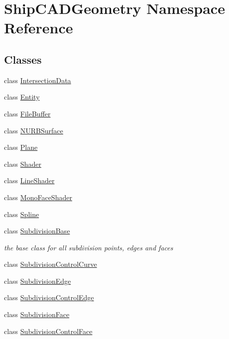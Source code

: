 \hypertarget{namespaceShipCADGeometry}{\section{Ship\-C\-A\-D\-Geometry Namespace Reference}
\label{namespaceShipCADGeometry}
}
\subsection*{Classes}
\begin{DoxyCompactItemize}
\item 
class \hyperlink{classShipCADGeometry_1_1IntersectionData}{Intersection\-Data}
\item 
class \hyperlink{classShipCADGeometry_1_1Entity}{Entity}
\item 
class \hyperlink{classShipCADGeometry_1_1FileBuffer}{File\-Buffer}
\item 
class \hyperlink{classShipCADGeometry_1_1NURBSurface}{N\-U\-R\-B\-Surface}
\item 
class \hyperlink{classShipCADGeometry_1_1Plane}{Plane}
\item 
class \hyperlink{classShipCADGeometry_1_1Shader}{Shader}
\item 
class \hyperlink{classShipCADGeometry_1_1LineShader}{Line\-Shader}
\item 
class \hyperlink{classShipCADGeometry_1_1MonoFaceShader}{Mono\-Face\-Shader}
\item 
class \hyperlink{classShipCADGeometry_1_1Spline}{Spline}
\item 
class \hyperlink{classShipCADGeometry_1_1SubdivisionBase}{Subdivision\-Base}
\begin{DoxyCompactList}\small\item\em the base class for all subdivision points, edges and faces \end{DoxyCompactList}\item 
class \hyperlink{classShipCADGeometry_1_1SubdivisionControlCurve}{Subdivision\-Control\-Curve}
\item 
class \hyperlink{classShipCADGeometry_1_1SubdivisionEdge}{Subdivision\-Edge}
\item 
class \hyperlink{classShipCADGeometry_1_1SubdivisionControlEdge}{Subdivision\-Control\-Edge}
\item 
class \hyperlink{classShipCADGeometry_1_1SubdivisionFace}{Subdivision\-Face}
\item 
class \hyperlink{classShipCADGeometry_1_1SubdivisionControlFace}{Subdivision\-Control\-Face}

\end{DoxyCompactItemize}
